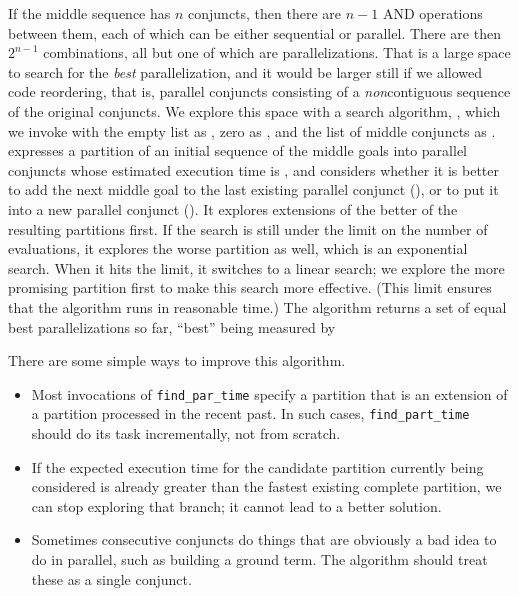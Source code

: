 If the middle sequence has $n$ conjuncts,
then there are $n-1$ AND operations between them,
each of which can be either sequential or parallel.
There are then $2^{n-1}$ combinations,
all but one of which are parallelizations.
That is a large space to search for the \emph{best} parallelization,
and it would be larger still if we allowed code reordering,
that is, parallel conjuncts consisting of
a \emph{non}contiguous sequence of the original conjuncts.
We explore this space with a search algorithm,
, which
we invoke with the empty list as ,
zero as , and the list of middle conjuncts as .
 expresses a partition of an initial sequence
of the middle goals into parallel conjuncts
whose estimated execution time is ,
and considers whether it is better to add the next middle goal
to the last existing parallel conjunct (),
or to put it into a new parallel conjunct ().
It explores extensions of the better of the resulting partitions first.
If the search is still under the limit on the number of evaluations,
it explores the worse partition as well,
which is an exponential search.
When it hits the limit, 
it switches to a linear search;
we explore the more promising partition first
to make this search more effective.
(This limit ensures that the algorithm runs in reasonable time.)
The algorithm returns a set of equal best parallelizations so far,
``best'' being measured by

There are some simple ways to improve this algorithm.
\begin{itemize}
\item
Most invocations of \verb|find_par_time| specify a partition
that is an extension of a partition processed in the recent past.
In such cases, \verb|find_part_time| should do its task
incrementally, not from scratch.
\item
If the expected execution time
for the candidate partition currently being considered
is already greater than the fastest existing complete partition,
we can stop exploring that branch;
it cannot lead to a better solution.
\item
Sometimes consecutive conjuncts do things that are
obviously a bad idea to do in parallel, such as building a ground term.
The algorithm should treat these as a single conjunct.
\end{itemize}


